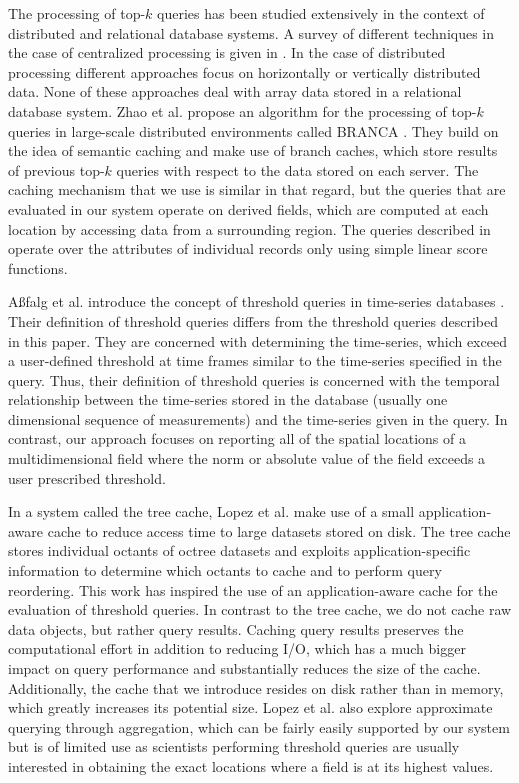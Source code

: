 \documentclass{sig-alternate}
\begin{document}
The processing of top-$k$ queries has been studied extensively in the context of distributed and relational database systems. A survey of different techniques
in the case of centralized processing is given in \cite{Ilyas}. In the case of distributed processing different approaches focus on horizontally 
\cite{Balke, Vlachou} or vertically \cite{Cao, Chaudhuri, Guntzer, Marian, Michel} distributed data. None of these approaches deal with array data stored in
a relational database system. Zhao et al. propose an algorithm for the processing of top-$k$ queries in large-scale distributed environments called BRANCA
\cite{Zhao}. They build on the idea of semantic caching \cite{Ren} and make use of branch caches, which store results of previous top-$k$ queries with respect 
to the data stored on each server. The caching mechanism that we use is similar in that regard, but the queries that are evaluated in our system operate on
derived fields, which are computed at each location by accessing data from a surrounding region. The queries described in \cite{Zhao} operate over the 
attributes of individual records only using simple linear score functions.

A{\ss}falg et al. introduce the concept of threshold queries in time-series databases \cite{Asfalg}. Their definition of threshold queries differs from the threshold
queries described in this paper. They are concerned with determining the time-series, which exceed a user-defined threshold at time frames similar to
the time-series specified in the query. Thus, their definition of threshold queries is concerned with the temporal relationship between the time-series
stored in the database (usually one dimensional sequence of measurements) and the time-series given in the query. In contrast, our approach focuses on
reporting all of the spatial locations of a multidimensional field where the norm or absolute value of the field exceeds a user prescribed threshold.

In a system called the tree cache, Lopez et al. \cite{Lopez} make use of a small application-aware cache to reduce access time to large datasets stored on
disk. The tree cache stores individual octants of octree datasets and exploits application-specific information to determine which octants to cache and to 
perform query reordering. This work has inspired the use of an application-aware cache for the evaluation of threshold queries. In contrast to the tree cache,
we do not cache raw data objects, but rather query results. Caching query results preserves the computational effort in addition to reducing I/O, which has a
much bigger impact on query performance and substantially reduces the size of the cache. Additionally, the cache that we introduce resides on disk rather 
than in memory, which greatly increases its potential size. Lopez et al. also explore approximate querying through aggregation, which can be fairly easily
supported by our system but is of limited use as scientists performing threshold queries are usually interested in obtaining the exact locations where a field is 
at its highest values.
\end{document}
